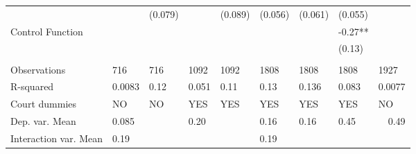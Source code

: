 \begin{tabular}{llrrrlrrr}
      &       & \multicolumn{1}{l}{(0.079)} & \multicolumn{1}{l}{} & \multicolumn{1}{l}{(0.089)} & (0.056) & \multicolumn{1}{l}{(0.061)} & \multicolumn{1}{l}{(0.055)} &  \\
Control Function &       &       &       &       &       &       & \multicolumn{1}{l}{-0.27**} &  \\
      &       &       &       &       &       &       & \multicolumn{1}{l}{(0.13)} &  \\
      &       &       &       &       &       &       &       &  \\
\midrule
Observations & 716   & \multicolumn{1}{l}{716} & \multicolumn{1}{l}{1092} & \multicolumn{1}{l}{1092} & 1808  & \multicolumn{1}{l}{1808} & \multicolumn{1}{l}{1808} & \multicolumn{1}{l}{1927} \\
R-squared & 0.0083 & \multicolumn{1}{l}{0.12} & \multicolumn{1}{l}{0.051} & \multicolumn{1}{l}{0.11} & 0.13  & \multicolumn{1}{l}{0.136} & \multicolumn{1}{l}{0.083} & \multicolumn{1}{l}{0.0077} \\
Court dummies  & NO    & \multicolumn{1}{l}{NO} & \multicolumn{1}{l}{YES} & \multicolumn{1}{l}{YES} & YES   & \multicolumn{1}{l}{YES} & \multicolumn{1}{l}{YES} & \multicolumn{1}{l}{NO} \\
Dep. var. Mean & 0.085 &       & \multicolumn{1}{l}{0.20} &       & 0.16  & \multicolumn{1}{l}{0.16} & \multicolumn{1}{l}{0.45} & 0.49 \\
Interaction var. Mean & 0.19  &       &       &       & 0.19  &       &       &  \\
\bottomrule
\bottomrule
\end{tabular}%
